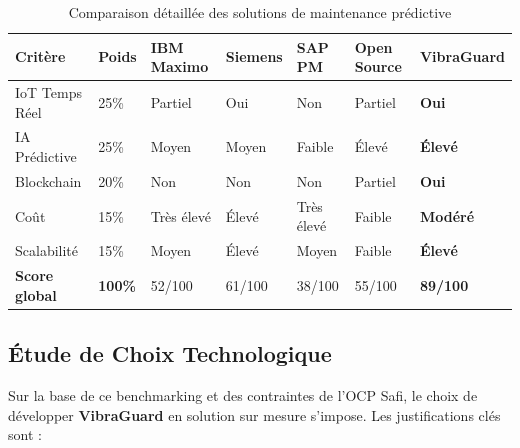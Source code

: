 \documentclass[12pt, a4paper, oneside]{report}
\newcommand{\projectname}{\textbf{VibraGuard}}
\begin{document}
\begin{table}[H]
  \centering
  \scriptsize
  \begin{tabularx}{\textwidth}{L{2.5cm} C{1.5cm} C{1.8cm} C{1.5cm} C{1.5cm} C{1.5cm} C{1.8cm}}
    \toprule
    \textbf{Critère} &
    \textbf{Poids} &
    \textbf{IBM Maximo} &
    \textbf{Siemens} &
    \textbf{SAP PM} &
    \textbf{Open Source} &
    \textbf{\projectname{}} \\
    \midrule
           IoT Temps Réel   & 25\% & Partiel & Oui  & Non    & Partiel & \textbf{Oui} \\
    IA Prédictive    & 25\% & Moyen   & Moyen& Faible & Élevé   & \textbf{Élevé} \\
           Blockchain       & 20\% & Non     & Non  & Non    & Partiel & \textbf{Oui} \\
    Coût             & 15\% & Très élevé & Élevé & Très élevé & Faible & \textbf{Modéré} \\
           Scalabilité      & 15\% & Moyen   & Élevé& Moyen  & Faible  & \textbf{Élevé} \\
    \midrule
       \textbf{Score global} & \textbf{100\%} & 52/100 & 61/100 & 38/100 & 55/100 & \textbf{89/100} \\
    \bottomrule
  \end{tabularx}
  \caption{Comparaison détaillée des solutions de maintenance prédictive}
\end{table}

\subsection{Étude de Choix Technologique}

Sur la base de ce benchmarking et des contraintes de l'OCP Safi, le choix de développer
\projectname{} en solution sur mesure s'impose. Les justifications clés sont :
\end{document}
